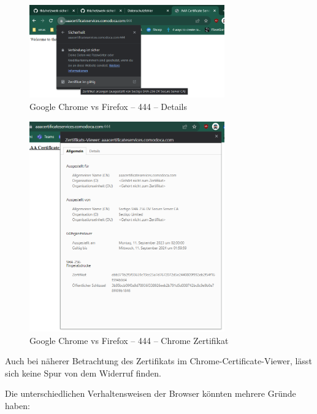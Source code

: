 \documentclass{article}
\begin{document}
\begin{figure}[H]
	\includegraphics[width=0.75\textwidth]{images/07} 
	\centering
	\caption{Google Chrome vs Firefox – 444 – Details}
\end{figure}

\begin{figure}[H]
	\includegraphics[width=0.75\textwidth]{images/08}
	\centering
	\caption{Google Chrome vs Firefox – 444 – Chrome Zertifikat}
\end{figure}

Auch bei näherer Betrachtung des Zertifikats im Chrome-Certificate-Viewer, lässt sich keine Spur von dem Widerruf finden.

Die unterschiedlichen Verhaltensweisen der Browser könnten mehrere Gründe haben:
\end{document}
